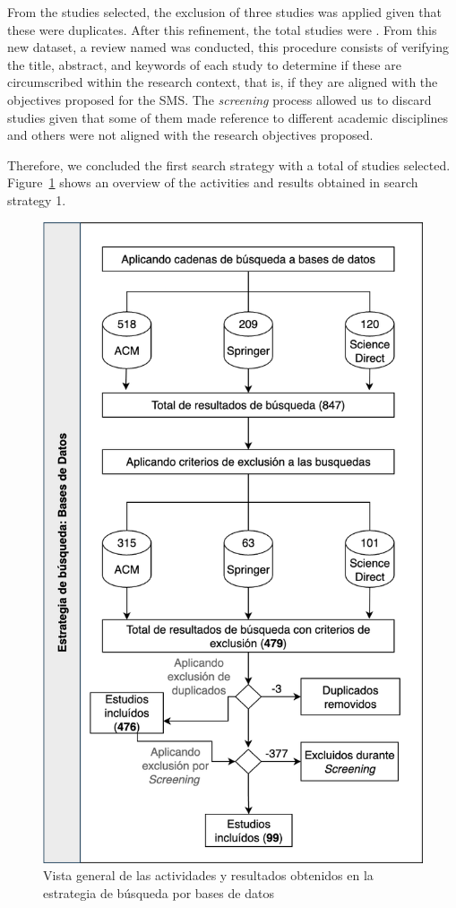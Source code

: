 
From the \itot{} studies selected, the exclusion of three studies was applied given that these were duplicates. After this refinement, the total studies were \depTot{}. From this new dataset, a review named  was conducted, this procedure consists of verifying the title, abstract, and keywords of each study to determine if these are circumscribed within the research context, that is, if they are aligned with the objectives proposed for the SMS. The \textit{screening} process allowed us to discard \screen{} studies given that some of them made reference to different academic disciplines and others were not aligned with the research objectives proposed.

Therefore, we concluded the first search strategy with a total of \screenTot{} studies selected. Figure~\ref{fig:overview} shows an overview of the activities and results obtained in search strategy 1.

\begin{figure}[htbp]
	\centering
	\includegraphics[scale=0.25]{resources/figures/overview.png}
	\caption{Vista general de las actividades y resultados obtenidos en la estrategia de búsqueda por bases de datos}
	\label{fig:overview}
\end{figure}


